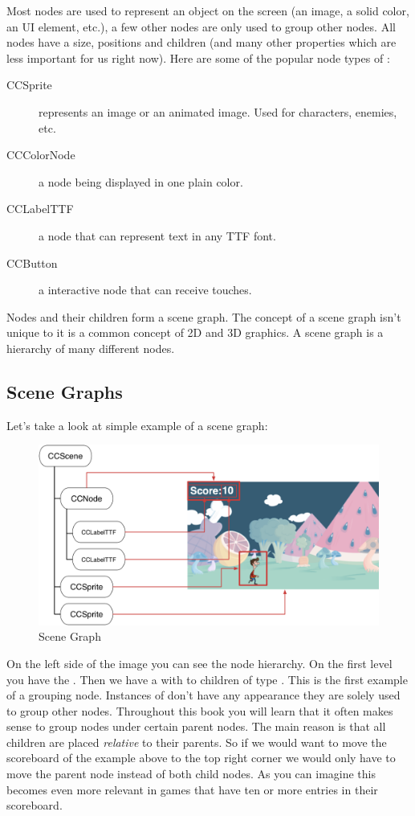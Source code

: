 Most nodes are used to represent an object on the screen (an image, a solid
color, an UI element, etc.), a few other nodes are only used to group other
nodes. All nodes have a size, positions and children (and many other properties
which are less important for us right now). Here are some of the popular
node types of \cocos{}:

\begin{description}
  \item[CCSprite] represents an image or an animated image. Used for characters,
  enemies, etc.
  \item[CCColorNode] a node being displayed in one plain color.
  \item[CCLabelTTF] a node that can represent text in any TTF font.
  \item[CCButton] a interactive node that can receive touches.
\end{description}

Nodes and their children form a scene graph. The concept of a scene graph isn't
unique to \cocos{} it is a common concept of 2D and 3D graphics. A scene graph
is a hierarchy of many different nodes. 

\subsection{Scene Graphs}
Let's take a look at simple example of a scene graph:

\begin{figure}[H]
		\centering
		\includegraphics[width=0.9\linewidth]{images/cocos2d/SceneGraph.png}     
		\caption{\cocos{} Scene Graph}
\end{figure}

On the left side of the image you can see the node hierarchy. On the first level
you have the \ccscene{}. Then we have a \ccnode{} with to children of type
\cclabel{}. This \ccnode{} is the first example of a grouping node. Instances of
\ccnode{} don't have any appearance they are solely used to group other nodes.
Throughout this book you will learn that it often makes sense to group nodes
under certain parent nodes. The main reason is that all children are placed
\textit{relative} to their parents. So if we would want to move the scoreboard
of the example above to the top right corner we would only have to move the
parent node instead of both child nodes. As you can imagine this becomes
even more relevant in games that have ten or more entries in their scoreboard.

